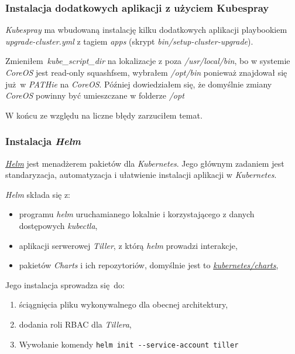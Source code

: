 \documentclass[a4paper,12pt,twoside,openany]{report}
\providecommand{\tightlist}{%
  \setlength{\itemsep}{0pt}\setlength{\parskip}{0pt}}
\newcommand{\passthrough}[1]{#1}
\begin{document}
\hypertarget{instalacja-dodatkowych-aplikacji-z-uux17cyciem-kubespray}{%
\subsubsection{Instalacja dodatkowych aplikacji z użyciem
Kubespray}\label{instalacja-dodatkowych-aplikacji-z-uux17cyciem-kubespray}}

\emph{Kubespray} ma wbudowaną instalację kilku dodatkowych aplikacji
playbookiem \emph{upgrade-cluster.yml} z tagiem \emph{apps} (skrypt
\emph{bin/setup-cluster-upgrade}).

Zmieniłem~\emph{kube\_script\_dir} na lokalizacje z poza
\emph{/usr/local/bin}, bo w systemie \emph{CoreOS} jest read-only
squashfsem, wybrałem \emph{/opt/bin} ponieważ znajdował się już~w
\emph{PATHie} na \emph{CoreOS}. Później dowiedziałem się, że domyślnie
zmiany \emph{CoreOS} powinny być umieszczane w folderze \emph{/opt}

W końcu ze względu na liczne błędy zarzuciłem temat.

\hypertarget{instalacja-helm}{%
\subsubsection{\texorpdfstring{Instalacja
\emph{Helm}}{Instalacja Helm}}\label{instalacja-helm}}

\href{https://github.com/kubernetes/helm}{\emph{Helm}} jest menadżerem
pakietów dla \emph{Kubernetes}. Jego głównym zadaniem jest
standaryzacja, automatyzacja i ułatwienie instalacji aplikacji w
\emph{Kubernetes}.

\emph{Helm} składa się z:

\begin{itemize}
\tightlist
\item
  programu \emph{helm} uruchamianego lokalnie i korzystającego z danych
  dostępowych \emph{kubectla},
\item
  aplikacji serwerowej \emph{Tiller}, z którą \emph{helm} prowadzi
  interakcje,
\item
  pakietów \emph{Charts} i ich repozytoriów, domyślnie jest to
  \href{https://github.com/kubernetes/charts}{\emph{kubernetes/charts}},
\end{itemize}

Jego instalacja sprowadza się~do:

\begin{enumerate}
\def\labelenumi{\arabic{enumi}.}
\tightlist
\item
  ściągnięcia pliku wykonywalnego dla obecnej architektury,
\item
  dodania roli RBAC dla \emph{Tillera},
\item
  Wywołanie komendy
  \passthrough{\lstinline!helm init --service-account tiller!}
\end{enumerate}
\end{document}
